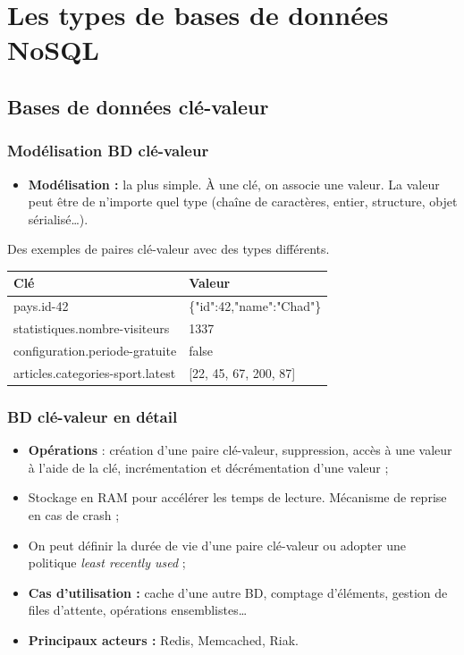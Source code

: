 \section{Les types de bases de données NoSQL}

	\subsection{Bases de données clé-valeur}
	\begin{frame}
		\frametitle{Modélisation BD clé-valeur}

		\begin{itemize}
			\item \textbf{Modélisation :} la plus simple. À une clé, on associe une valeur. La valeur peut être de n'importe quel type (chaîne de caractères, entier, structure, objet sérialisé\dots).
		\end{itemize}

		\vspace{15px}
		Des exemples de paires clé-valeur avec des types différents.
		\vspace{5px}
		\begin{tabular}{|l|l|}
			\hline
			\textbf{Clé} & \textbf{Valeur} \\ \hline\hline
			pays.id-42 & \{"id":42,"name":"Chad"\} \\ \hline
			statistiques.nombre-visiteurs & 1337 \\ \hline
			configuration.periode-gratuite & false \\ \hline
			articles.categories-sport.latest & [22, 45, 67, 200, 87] \\ \hline
		\end{tabular}
	\end{frame}

	\begin{frame}
		\frametitle{BD clé-valeur en détail}
		\begin{itemize}
			\item \textbf{Opérations} : création d'une paire clé-valeur, suppression, accès à une valeur à l'aide de la clé, incrémentation et décrémentation d'une valeur ;
			\item Stockage en RAM pour accélérer les temps de lecture. Mécanisme de reprise en cas de crash ;
			\item On peut définir la durée de vie d'une paire clé-valeur ou adopter une politique \textit{least recently used} ;
			\item \textbf{Cas d'utilisation :} cache d'une autre BD, comptage d'éléments, gestion de files d'attente, opérations ensemblistes\dots
			\item \textbf{Principaux acteurs :} Redis, Memcached, Riak.
		\end{itemize}
	\end{frame}

